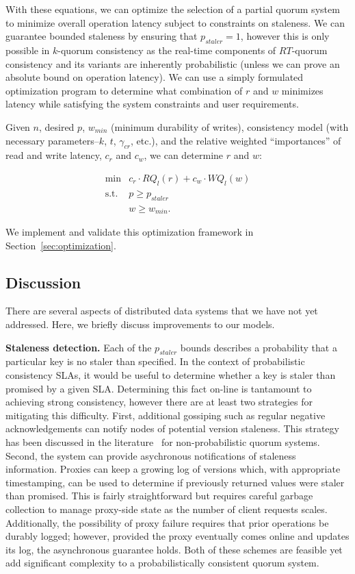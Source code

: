 \documentclass{vldb}
\begin{document}
With these equations, we can optimize the selection of a partial
quorum system to minimize overall operation latency subject to
constraints on staleness. We can guarantee bounded staleness by
ensuring that $p_{staler} = 1$, however this is only possible in
$k$-quorum consistency as the real-time components of $RT$-quorum
consistency and its variants are inherently probabilistic (unless we
can prove an absolute bound on operation latency).  We can use a
simply formulated optimization program to determine what combination
of $r$ and $w$ minimizes latency while satisfying the system
constraints and user requirements.

Given $n$, desired $p$, $w_{min}$ (minimum durability of writes),
consistency model (with necessary parameters--$k$, $t$, $\gamma_{cr}$,
etc.), and the relative weighted ``importances'' of read
and write latency, $c_r$ and $c_w$, we can determine $r$ and $w$:

\begin{equation}
 \begin{array}{rl}
    \min        & c_r\cdot RQ_l(r) +c_w \cdot WQ_l(w) \\
    \mbox{s.t.} & p \ge p_{staler} \\
                & w \ge w_{min}.
    \end{array}
\end{equation}

We implement and validate this optimization framework in
Section~\ref{sec:optimization}.

\subsection{Discussion}
\label{sec:discussion}

There are several aspects of distributed data systems that we have not yet
addressed.  Here, we briefly discuss improvements to our models.

\textbf{Staleness detection.} Each of the $p_{staler}$ bounds
describes a probability that a particular key is no staler than
specified.  In the context of probabilistic consistency SLAs, it would
be useful to determine whether a key is staler than promised by a
given SLA.  Determining this fact on-line is tantamount to achieving
strong consistency, however there are at least two strategies for
mitigating this difficulty. First, additional gossiping such as
regular negative acknowledgements can notify nodes of potential
version staleness.  This strategy has been discussed in the
literature~\cite{tocite} for non-probabilistic quorum systems.
Second, the system can provide asychronous notifications of staleness
information.  Proxies can keep a growing log of versions which, with
appropriate timestamping, can be used to determine if previously
returned values were staler than promised.  This is fairly
straightforward but requires careful garbage collection to manage
proxy-side state as the number of client requests scales.
Additionally, the possibility of proxy failure requires that prior
operations be durably logged; however, provided the proxy eventually
comes online and updates its log, the asynchronous guarantee holds.
Both of these schemes are feasible yet add significant complexity to a
probabilistically consistent quorum system.
\end{document}
